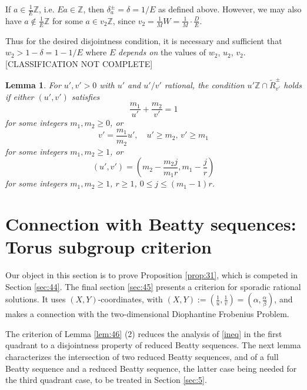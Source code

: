 \documentclass[12pt,letterpaper, reqno]{amsart}
\newtheorem{lem}[thm]{Lemma}
\theoremstyle{definition}
\theoremstyle{remark}
\newcommand{\ZZ}{\ensuremath{\mathbb{Z}}}
\newcommand{\uu}{{u'}}
\newcommand{\vv}{{v'}}
\begin{document}
If $a \in \frac1E\ZZ$, i.e. $Ea \in \ZZ$, then $\delta_a^\pm = \delta = 1/E$ as defined above. However, we may also have $a\not\in \frac1E\ZZ$ for some $a\in v_2\ZZ$, since $v_2 = \frac 1M W = \frac1M \cdot\frac DE$.

Thus for the desired disjointness condition, it is necessary and sufficient that $w_2 > 1-\delta = 1-1/E $ where $E$ {\em depends on} the values of $w_2$, $u_2$, $v_2$. [CLASSIFICATION NOT COMPLETE]

\begin{lem}\label{lem:511}
For $\uu,\vv>0$ with $\uu$ and $\uu/\vv$ rational, the condition $\uu\ZZ \cap \widetilde{R}^\pm_\vv$ holds if either $(\uu,\vv)$ satisfies
\[ \frac{m_1}{\uu} + \frac{m_2}{\vv} = 1\]
for some integers  $m_1,m_2\geq 0$, or 
\[ \vv = \frac{m_1}{m_2}\uu, \quad \uu\geq m_2,\, \vv\geq m_1\]
for some integers $m_1,m_2\geq 1$, or
\[ (\uu,\vv) = (m_2 - \frac{m_2 j}{m_1 r}, m_1 - \frac{j}{r})\]
for some integers $m_1, m_2 \geq 1$, $r \geq 1$, $0 \leq j \leq (m_1-1)r$.
\end{lem}


%
%
\section{Connection with Beatty sequences: Torus subgroup criterion}\label{sec:torus-subgp}

Our object in this section is to prove Proposition \ref{prop:31}, which is competed in Section \ref{sec:44}.
The final section \ref{sec:45} presents a criterion for sporadic rational solutions. 
It uses $(X,Y)$-coordinates, with $(X, Y) := (\frac{1}{u}, \frac{1}{v}) = (\alpha, \frac{\alpha}{\beta})$,
and makes a connection with the two-dimensional Diophantine Frobenius Problem.

The  criterion of Lemma \ref{lem:46} (2)  reduces the analysis of \eqref{ineq} in the
first quadrant  to a disjointness property of reduced Beatty sequences. 
 The next lemma characterizes the intersection of two reduced Beatty sequences,
 and of a full Beatty sequence and a reduced Beatty sequence, the latter case being
 needed for  the third quadrant case, to be treated in Section \ref{sec:5}.
 
\end{document}
